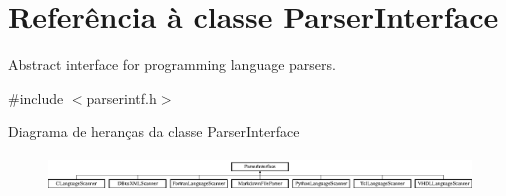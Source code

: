 \hypertarget{class_parser_interface}{\section{Referência à classe Parser\-Interface}
\label{class_parser_interface}
}


Abstract interface for programming language parsers.  




{\ttfamily \#include $<$parserintf.\-h$>$}

Diagrama de heranças da classe Parser\-Interface\begin{figure}[H]
\begin{center}
\leavevmode
\includegraphics[height=0.963855cm]{class_parser_interface}
\end{center}
\end{figure}
